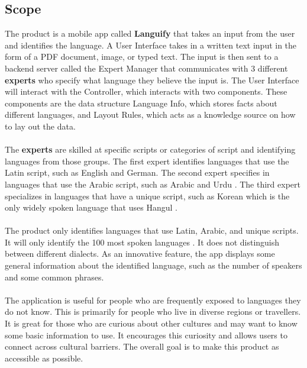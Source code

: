 \subsection{Scope}
\label{sub:scope}
The product is a mobile app called \textbf{Languify} that takes an input from the user and identifies the language. 
A User Interface takes in a written text input in the form of a PDF document, image, or typed text. 
The input is then sent to a backend server called the Expert Manager that communicates with 3 different \textbf{experts} who specify what language they believe the input is. 
The User Interface will interact with the Controller, which interacts with two components.
These components are the data structure Language Info, which stores facts about different languages, and Layout Rules, which acts as a knowledge source on how to lay out the data.\\ \\
The \textbf{experts} are skilled at specific scripts or categories of script and identifying languages from those groups. The first expert identifies languages that use the Latin script, such as English and German. 
The second expert specifies in languages that use the Arabic script, such as Arabic and Urdu \cite{Britannica2025_WritingSystems}. The third expert specializes in languages that have a unique script, such as Korean which is the only widely spoken language that uses Hangul \cite{Britannica2025_Hangul}. \\ \\
The product only identifies languages that use Latin, Arabic, and unique scripts. It will only identify the 100 most spoken languages \cite{Ethnologue2025}. It does not distinguish between different dialects. As an innovative feature, the app displays some general information about the identified language, such as the number of speakers and some common phrases.\\ \\
The application is useful for people who are frequently exposed to languages they do not know. This is primarily for people who live in diverse regions or travellers. It is great for those who are curious about other cultures and may want to know some basic information to use. It encourages this curiosity and allows users to connect across cultural barriers. The overall goal is to make this product as accessible as possible.


